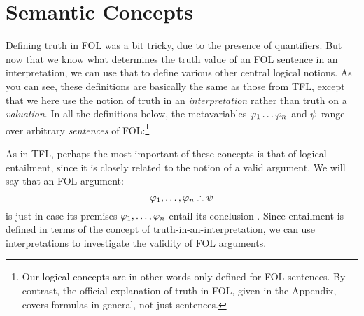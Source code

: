\section{Semantic Concepts}\label{s:FOLSemanticConcepts}

Defining truth in FOL was a bit tricky, due to the presence of quantifiers. But now that we know what determines the truth value of an FOL sentence in an interpretation, we can use that to define various other central logical notions.   As you can see, these definitions are basically the same as those from TFL, except that we here use the notion of truth in an \emph{interpretation} rather than truth on a \emph{valuation}.  In all the definitions below, the metavariables $\mathcal{\varphi}_1 \ldots \mathcal{\varphi}_n$ and $\mathcal{\psi}$ range over arbitrary \emph{sentences} of FOL:\footnote{Our logical concepts are in other words only defined for FOL sentences.  By contrast, the official explanation of truth in FOL, given in the Appendix, covers formulas in general, not just sentences.}


As in TFL, perhaps the most important of these concepts is that of logical entailment, since it is closely related to the notion of a valid argument.  We will say that an FOL argument:
$$\mathcal{\varphi}_1, \ldots, \mathcal{\varphi}_n \therefore \mathcal{\psi}$$
is  just in case its premises $\mathcal{\varphi}_1, \ldots, \mathcal{\varphi}_n$ entail its conclusion \meta{\psi}.  Since entailment is defined in terms of the concept of truth-in-an-interpretation, we can use interpretations to investigate the validity of FOL arguments.

